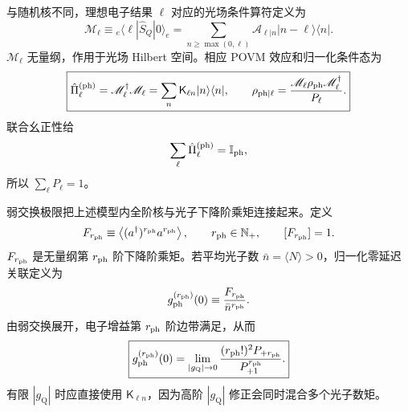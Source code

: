 \begin{exbox}
与随机核不同，理想电子结果 $\ell$ 对应的光场条件算符定义为
\begin{equation*}
\mathscr M_\ell
\equiv{}_e\!\langle\ell|\hat S_Q|0\rangle_e
=\sum_{n\ge\max(0,\ell)}
\mathcal A_{\ell|n}|n-\ell\rangle\langle n|.
\end{equation*}
$\mathscr M_\ell$ 无量纲，作用于光场 Hilbert 空间。相应 POVM 效应和归一化条件态为
\begin{equation}
\boxed{
\hat\Pi_\ell^{({\rm ph})}
=\mathscr M_\ell^\dagger\mathscr M_\ell
=\sum_n\mathsf K_{\ell n}|n\rangle\langle n|,
\qquad
\rho_{\rm ph|\ell}
=\frac{\mathscr M_\ell\rho_{\rm ph}\mathscr M_\ell^\dagger}{P_\ell}.}
\label{eq:single_electron_photon_instrument}
\end{equation}
联合幺正性给
\[
\sum_\ell \hat\Pi_\ell^{({\rm ph})}=\mathbb I_{\rm ph},
\]
所以 $\sum_\ell P_\ell=1$。

弱交换极限把上述模型内全阶核与光子下降阶乘矩连接起来。定义
\begin{equation*}
F_{r_{\rm ph}}
\equiv\left\langle
(a^\dagger)^{r_{\rm ph}}a^{r_{\rm ph}}
\right\rangle,
\qquad r_{\rm ph}\in\mathbb N_+,
\qquad
[F_{r_{\rm ph}}]=1.
\end{equation*}
$F_{r_{\rm ph}}$ 是无量纲第 $r_{\rm ph}$ 阶下降阶乘矩。若平均光子数 $\bar n=\langle N\rangle>0$，归一化零延迟关联定义为
\begin{equation*}
g_{\rm ph}^{(r_{\rm ph})}(0)
\equiv\frac{F_{r_{\rm ph}}}{\bar n^{r_{\rm ph}}}.
\end{equation*}
由弱交换展开，电子增益第 $r_{\rm ph}$ 阶边带满足，从而
\begin{equation}
\boxed{
g_{\rm ph}^{(r_{\rm ph})}(0)
=\lim_{|g_{\mathrm Q}|\to0}
\frac{(r_{\rm ph}!)^2P_{+r_{\rm ph}}}{P_{+1}^{r_{\rm ph}}}.}
\label{eq:electron_factorial_correlation_readout}
\end{equation}
有限 $|g_{\mathrm Q}|$ 时应直接使用 $\mathsf K_{\ell n}$，因为高阶 $|g_{\mathrm Q}|$ 修正会同时混合多个光子数矩。

\medskip


\end{exbox}
